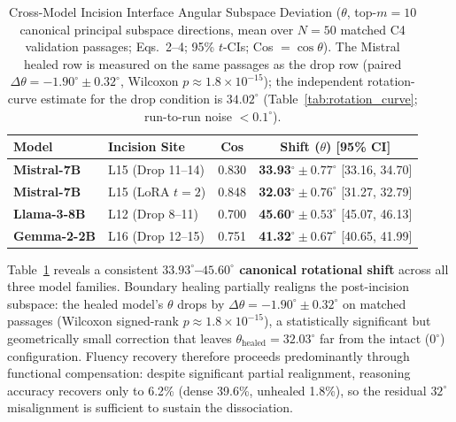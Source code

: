 \documentclass[pmlr,onecolumn]{jmlr}
\begin{document}
\begin{table}[t!]
\centering
\small
\setlength{\tabcolsep}{3pt}
\caption{Cross-Model Incision Interface Angular Subspace Deviation ($\theta$, top-$m=10$ canonical principal subspace directions, mean over $N=50$ matched C4 validation passages; Eqs.~2--4; 95\% $t$-CIs; Cos $= \cos\theta$). The Mistral healed row is measured on the same passages as the drop row (paired $\Delta\theta = -1.90^\circ \pm 0.32^\circ$, Wilcoxon $p \approx 1.8\times10^{-15}$); the independent rotation-curve estimate for the drop condition is $34.02^\circ$ (Table~\ref{tab:rotation_curve}; run-to-run noise $< 0.1^\circ$).}
\label{tab:cross_model_geometry}
\begin{tabular}{llcc}
\toprule
\textbf{Model} & \textbf{Incision Site} & \textbf{Cos} & \textbf{Shift ($\theta$) [95\% CI]} \\
\midrule
\textbf{Mistral-7B} & L15 (Drop 11--14) & 0.830 & \textbf{33.93}$^\circ \!\pm\! 0.77^\circ$ [33.16, 34.70] \\
\textbf{Mistral-7B} & L15 (LoRA $t{=}2$) & 0.848 & \textbf{32.03}$^\circ \!\pm\! 0.76^\circ$ [31.27, 32.79] \\
\textbf{Llama-3-8B} & L12 (Drop 8--11) & 0.700 & \textbf{45.60}$^\circ \!\pm\! 0.53^\circ$ [45.07, 46.13] \\
\textbf{Gemma-2-2B} & L16 (Drop 12--15) & 0.751 & \textbf{41.32}$^\circ \!\pm\! 0.67^\circ$ [40.65, 41.99] \\
\bottomrule
\end{tabular}
\end{table}

Table~\ref{tab:cross_model_geometry} reveals a consistent \textbf{$33.93^\circ$--$45.60^\circ$ canonical rotational shift} across all three model families. Boundary healing partially realigns the post-incision subspace: the healed model's $\theta$ drops by $\Delta\theta = -1.90^\circ \pm 0.32^\circ$ on matched passages (Wilcoxon signed-rank $p \approx 1.8\times10^{-15}$), a statistically significant but geometrically small correction that leaves $\theta_{\text{healed}} = 32.03^\circ$ far from the intact ($0^\circ$) configuration. Fluency recovery therefore proceeds predominantly through functional compensation: despite significant partial realignment, reasoning accuracy recovers only to 6.2\% (dense 39.6\%, unhealed 1.8\%), so the residual $32^\circ$ misalignment is sufficient to sustain the dissociation.
\end{document}

